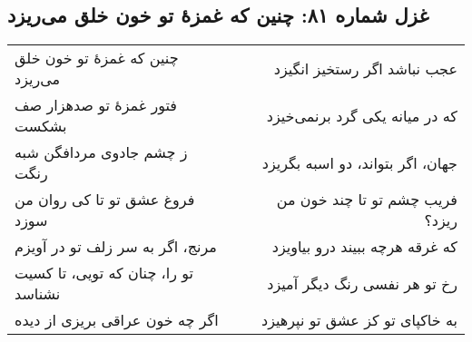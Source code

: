 \begin{center}
\section*{غزل شماره ۸۱: چنین که غمزهٔ تو خون خلق می‌ریزد}
\label{sec:081}
\begin{longtable}{l p{0.5cm} r}
چنین که غمزهٔ تو خون خلق می‌ریزد
&&
عجب نباشد اگر رستخیز انگیزد
\\
فتور غمزهٔ تو صدهزار صف بشکست
&&
که در میانه یکی گرد برنمی‌خیزد
\\
ز چشم جادوی مردافگن شبه رنگت
&&
جهان، اگر بتواند، دو اسبه بگریزد
\\
فروغ عشق تو تا کی روان من سوزد
&&
فریب چشم تو تا چند خون من ریزد؟
\\
مرنج، اگر به سر زلف تو در آویزم
&&
که غرقه هرچه ببیند درو بیاویزد
\\
تو را، چنان که تویی، تا کسیت نشناسد
&&
رخ تو هر نفسی رنگ دیگر آمیزد
\\
اگر چه خون عراقی بریزی از دیده
&&
به خاکپای تو کز عشق تو نپرهیزد
\\
\end{longtable}
\end{center}
